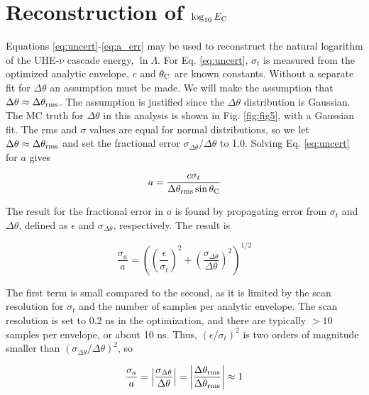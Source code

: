 \documentclass[amsmath,amssymb,aps,prd,10pt,twocolumn,showkeys]{revtex4}
\begin{document}
\section{Reconstruction of $\log_{10}E_{\rm C}$}
\label{sec:recon}

Equations \ref{eq:uncert}-\ref{eq:a_err} may be used to reconstruct the natural logarithm of the UHE-$\nu$ cascade energy, $\ln\Lambda$.  For Eq. \ref{eq:uncert}, $\sigma_t$ is measured from the optimized analytic envelope, $c$ and $\theta_{\rm C}$ are known constants.  Without a separate fit for $\Delta\theta$ an assumption must be made.  We will make the assumption that $\Delta\theta \approx \Delta\theta_{\rm rms}$.  The assumption is justified since the $\Delta\theta$ distribution is Gaussian.  The MC truth for $\Delta\theta$ in this analysis is shown in Fig. \ref{fig:fig5}, with a Gaussian fit.  The rms and $\sigma$ values are equal for normal distributions, so we let $\Delta\theta \approx \Delta \theta_{\rm rms}$ and set the fractional error $\sigma_{\Delta\theta}/\Delta\theta$ to 1.0.  Solving Eq. \ref{eq:uncert} for $a$ gives

\begin{equation}
a = \frac{c\sigma_t}{\Delta\theta_{\rm rms} \sin\theta_{\rm C}}
\end{equation}

The result for the fractional error in $a$ is found by propagating error from $\sigma_t$ and $\Delta\theta$, defined as $\epsilon$ and $\sigma_{\Delta\theta}$, respectively.  The result is

\begin{equation}
\frac{\sigma_a}{a} = \left(\left(\frac{\epsilon}{\sigma_t}\right)^2 +  \left(\frac{\sigma_{\Delta\theta}}{\Delta\theta}\right)^2\right)^{1/2} \label{eq:err_prop}
\end{equation}

The first term is small compared to the second, as it is limited by the scan resolution for $\sigma_t$ and the number of samples per analytic envelope.  The scan resolution is set to 0.2 ns in the optimization, and there are typically $>10$ samples per envelope, or about 10 ns.  Thus, $\left(\epsilon/\sigma_t\right)^2$ is two orders of magnitude smaller than $\left(\sigma_{\Delta\theta}/\Delta\theta\right)^2$, so

\begin{equation}
\frac{\sigma_a}{a} = \left|\frac{\sigma_{\Delta\theta}}{\Delta\theta}\right| = \left|\frac{\Delta\theta_{\rm rms}}{\Delta\theta_{\rm rms}}\right|\approx 1
\end{equation}
\end{document}
